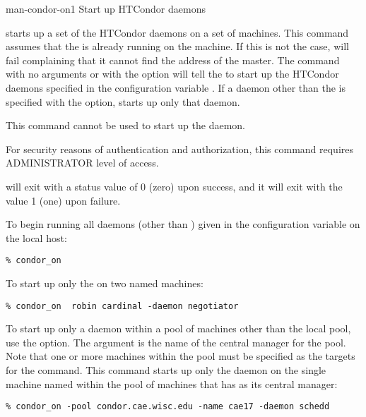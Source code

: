 \begin{ManPage}{}{man-condor-on}{1}
{Start up HTCondor daemons}

\Synopsis {}
\ToolArgsBase

\ToolDebugOption
\ToolWhere \ToolArgsAffect

\Description 

 starts up a set of the HTCondor daemons on a set of
machines.
This command assumes that the  is already
running on the machine.
If this is not the case,  will
fail complaining that it cannot find the address of the master.
The command  with no arguments or with
 the  option will
tell the  to start up the HTCondor daemons specified
in the configuration variable .
If a daemon other than the  is specified
with the  option,
 starts up only that daemon.

This command cannot be used to start up the  daemon.

For security reasons of authentication and authorization,
this command requires ADMINISTRATOR level of access.

\begin{Options}
    \ToolArgsBaseDesc
    \ToolDebugDesc
    \ToolArgsLocateDesc
    \ToolArgsAffectDesc
\end{Options}

\ExitStatus

 will exit with a status value of 0 (zero) upon success,
and it will exit with the value 1 (one) upon failure.

\Examples
To begin running all daemons (other than ) given
in the configuration variable 
on the local host:
\begin{verbatim}
% condor_on
\end{verbatim}

To start up only the  on two named machines:
\begin{verbatim}
% condor_on  robin cardinal -daemon negotiator
\end{verbatim}

To start up only a daemon within a pool of machines
other than the local pool, use the  option.
The argument is the name of the central manager for the pool.
Note that one or more machines within the pool must be
specified as the targets for the command.
This command starts up only the  daemon
on the single machine named  within the
pool of machines that has  as
its central manager:
\begin{verbatim}
% condor_on -pool condor.cae.wisc.edu -name cae17 -daemon schedd
\end{verbatim}

\end{ManPage}
